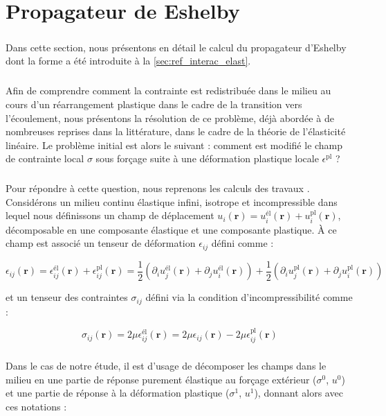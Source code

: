 \section{Propagateur de Eshelby}

\label{sec:Annexe_Eshelby}

\subparagraph{}Dans cette section, nous présentons en détail le calcul du propagateur d'Eshelby dont la forme a été introduite à la \autoref{sec:ref_interac_elast}.

\subparagraph{}Afin de comprendre comment la contrainte est redistribuée dans le milieu au cours d'un réarrangement plastique dans le cadre de la transition vers l'écoulement, nous présentons la résolution de ce problème, déjà abordée à de nombreuses reprises dans la littérature, dans le cadre de la théorie de l'élasticité linéaire. Le problème initial est alors le suivant : comment est modifié le champ de contrainte local $\sigma$ sous forçage suite à une déformation plastique locale $\epsilon^\text{pl}$ ?

\subparagraph{}Pour répondre à cette question, nous reprenons les calculs des travaux \cite{picard_elastic_2004, goff_flow_2021}. Considérons un milieu continu élastique infini, isotrope et incompressible dans lequel nous définissons un champ de déplacement $u_i(\mathbf{r}) = u_i^\text{él}(\mathbf{r}) + u_i^\text{pl}(\mathbf{r})$, décomposable en une composante élastique et une composante plastique. \`A ce champ est associé un tenseur de déformation $\epsilon_{ij}$ défini comme :

\begin{equation}
	\epsilon_{ij}(\mathbf{r}) = \epsilon^\text{él}_{ij}(\mathbf{r})+\epsilon^\text{pl}_{ij}(\mathbf{r}) = \frac{1}{2}\left( \partial_i u_j^\text{él}(\mathbf{r}) + \partial_j u_i^\text{él}(\mathbf{r}) \right) + \frac{1}{2}\left( \partial_i u_j^\text{pl}(\mathbf{r}) + \partial_j u_i^\text{pl}(\mathbf{r}) \right)
	\label{eq:tenseurdeformation}
\end{equation}

\noindent et un tenseur des contraintes $\sigma_{ij}$ défini via la condition d'incompressibilité comme :

\begin{equation}
	\sigma_{ij}(\mathbf{r}) = 2\mu\epsilon^\text{él}_{ij}(\mathbf{r}) = 2\mu\epsilon_{ij}(\mathbf{r}) - 2\mu \epsilon^\text{pl}_{ij}(\mathbf{r})
	\label{eq:tenseurcontrainte}
\end{equation}

\subparagraph{}Dans le cas de notre étude, il est d'usage de décomposer les champs dans le milieu en une partie de réponse purement élastique au forçage extérieur ($\sigma^0$, $u^0$) et une partie de réponse à la déformation plastique ($\sigma^1$, $u^1$), donnant alors avec ces notations :

